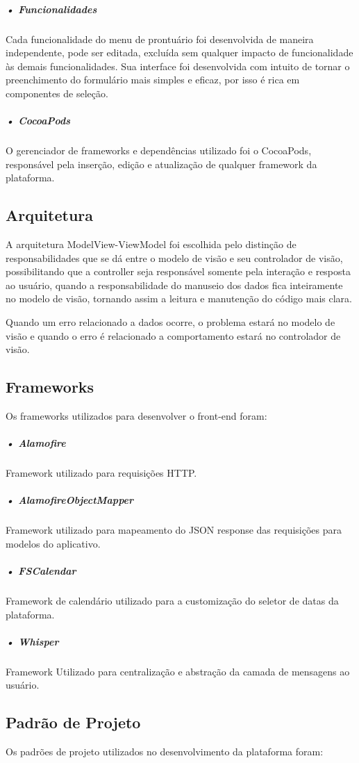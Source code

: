 \documentclass[portuguese,oneside]{tcc}
\begin{document}
\subparagraph{• Funcionalidades}
Cada funcionalidade do menu de prontuário foi desenvolvida de maneira independente, pode ser editada, excluída sem qualquer impacto de funcionalidade às demais funcionalidades. Sua interface foi desenvolvida com intuito de tornar o preenchimento do formulário mais simples e eficaz, por isso é rica em componentes de seleção.

\subparagraph{• CocoaPods}
O gerenciador de frameworks e dependências utilizado foi o CocoaPods, responsável pela inserção, edição e atualização de qualquer framework da plataforma.

\subsection{Arquitetura}
A arquitetura ModelView-ViewModel foi escolhida pelo distinção de responsabilidades que se dá entre o modelo de visão e seu controlador de visão, possibilitando que a controller seja responsável somente pela interação e resposta ao usuário, quando a responsabilidade do manuseio dos dados fica inteiramente no modelo de visão, tornando assim a leitura e manutenção do código mais clara. 

Quando um erro relacionado a dados ocorre, o problema estará no modelo de visão e quando o erro é relacionado a comportamento estará no controlador de visão.

\subsection{Frameworks}
Os frameworks utilizados para desenvolver o front-end foram:

\subparagraph{• Alamofire}
Framework utilizado para requisições HTTP.

\subparagraph{• AlamofireObjectMapper}
Framework utilizado para mapeamento do JSON response das requisições para modelos do aplicativo.

\subparagraph{• FSCalendar}
Framework de calendário utilizado para a customização do seletor de datas da plataforma.

\subparagraph{• Whisper}
Framework Utilizado para centralização e abstração da camada de mensagens ao usuário.

\subsection{Padrão de Projeto}
Os padrões de projeto utilizados no desenvolvimento da plataforma foram:
\end{document}
